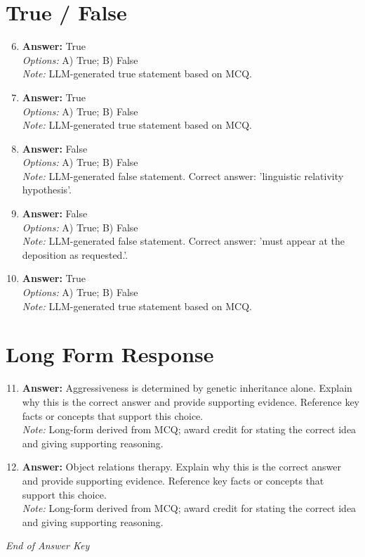 \documentclass[12pt]{article}
\begin{document}
\section*{True / False}
\begin{enumerate}[label=\arabic*.]
\setcounter{enumi}{5}
\item \textbf{Answer:} True
\\ \textit{Options:} A) True; B) False
\\ \textit{Note:} LLM-generated true statement based on MCQ.
\item \textbf{Answer:} True
\\ \textit{Options:} A) True; B) False
\\ \textit{Note:} LLM-generated true statement based on MCQ.
\item \textbf{Answer:} False
\\ \textit{Options:} A) True; B) False
\\ \textit{Note:} LLM-generated false statement. Correct answer: 'linguistic relativity hypothesis'.
\item \textbf{Answer:} False
\\ \textit{Options:} A) True; B) False
\\ \textit{Note:} LLM-generated false statement. Correct answer: 'must appear at the deposition as requested.'.
\item \textbf{Answer:} True
\\ \textit{Options:} A) True; B) False
\\ \textit{Note:} LLM-generated true statement based on MCQ.
\end{enumerate}

\section*{Long Form Response}
\begin{enumerate}[label=\arabic*.]
\setcounter{enumi}{10}
\item \textbf{Answer:} Aggressiveness is determined by genetic inheritance alone. Explain why this is the correct answer and provide supporting evidence. Reference key facts or concepts that support this choice.
\\ \textit{Note:} Long-form derived from MCQ; award credit for stating the correct idea and giving supporting reasoning.
\item \textbf{Answer:} Object relations therapy. Explain why this is the correct answer and provide supporting evidence. Reference key facts or concepts that support this choice.
\\ \textit{Note:} Long-form derived from MCQ; award credit for stating the correct idea and giving supporting reasoning.
\end{enumerate}

\vfill
\noindent\textit{End of Answer Key}
\end{document}
